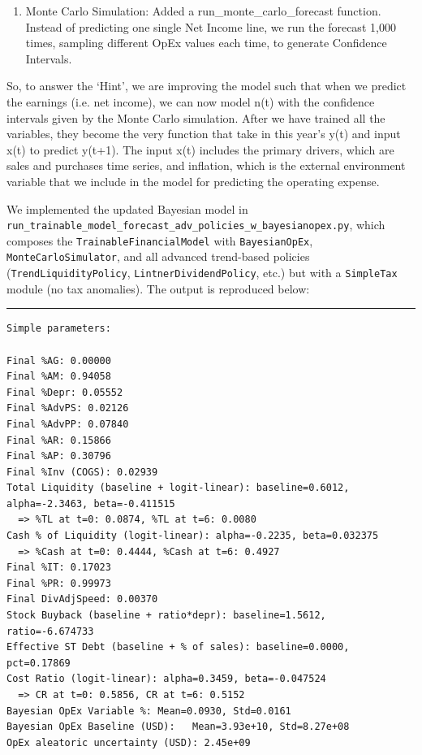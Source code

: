 \documentclass[12pt,a4paper]{article}
\begin{document}
\begin{enumerate}
\def\labelenumi{\arabic{enumi}.}
\setcounter{enumi}{2}
\item
  Monte Carlo Simulation: Added a run\_monte\_carlo\_forecast function.
  Instead of predicting one single Net Income line, we run the forecast
  1,000 times, sampling different OpEx values each time, to generate
  Confidence Intervals.
\end{enumerate}

So, to answer the `Hint', we are improving the model such that when we
predict the earnings (i.e. net income), we can now model n(t) with the
confidence intervals given by the Monte Carlo simulation. After we have
trained all the variables, they become the very function that take in
this year's y(t) and input x(t) to predict y(t+1). The input x(t)
includes the primary drivers, which are sales and purchases time series,
and inflation, which is the external environment variable that we
include in the model for predicting the operating expense.

We implemented the updated Bayesian model in \texttt{run\_trainable\allowbreak{}\_model\allowbreak{}\_forecast\allowbreak{}\_adv\allowbreak{}\_policies\allowbreak{}\_w\allowbreak{}\_bayesianopex.py},
which composes the \texttt{TrainableFinancialModel} with \texttt{BayesianOpEx},
\texttt{MonteCarloSimulator}, and all advanced trend-based policies
(\texttt{TrendLiquidityPolicy}, \texttt{LintnerDividendPolicy}, etc.)
but with a \texttt{SimpleTax} module (no tax anomalies). The output is reproduced
below:

\noindent\rule{\textwidth}{0.4pt}

\begin{lstlisting}[style=console, caption={Trained policy parameters with Bayesian OpEx}, label=lst:params_simple_bayesian]
Simple parameters:

Final %AG: 0.00000
Final %AM: 0.94058
Final %Depr: 0.05552
Final %AdvPS: 0.02126
Final %AdvPP: 0.07840
Final %AR: 0.15866
Final %AP: 0.30796
Final %Inv (COGS): 0.02939
Total Liquidity (baseline + logit-linear): baseline=0.6012, alpha=-2.3463, beta=-0.411515
  => %TL at t=0: 0.0874, %TL at t=6: 0.0080
Cash % of Liquidity (logit-linear): alpha=-0.2235, beta=0.032375
  => %Cash at t=0: 0.4444, %Cash at t=6: 0.4927
Final %IT: 0.17023
Final %PR: 0.99973
Final DivAdjSpeed: 0.00370
Stock Buyback (baseline + ratio*depr): baseline=1.5612, ratio=-6.674733
Effective ST Debt (baseline + % of sales): baseline=0.0000, pct=0.17869
Cost Ratio (logit-linear): alpha=0.3459, beta=-0.047524
  => CR at t=0: 0.5856, CR at t=6: 0.5152
Bayesian OpEx Variable %: Mean=0.0930, Std=0.0161
Bayesian OpEx Baseline (USD):   Mean=3.93e+10, Std=8.27e+08
OpEx aleatoric uncertainty (USD): 2.45e+09
\end{lstlisting}
\end{document}
